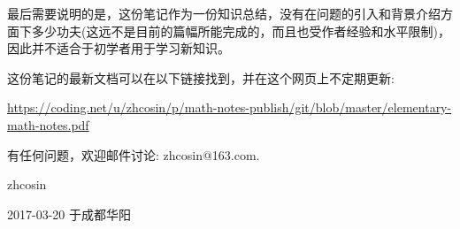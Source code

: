 最后需要说明的是，这份笔记作为一份知识总结，没有在问题的引入和背景介绍方面下多少功夫(这远不是目前的篇幅所能完成的，而且也受作者经验和水平限制)，因此并不适合于初学者用于学习新知识。

这份笔记的最新文档可以在以下链接找到，并在这个网页上不定期更新:

\hyperref[pdf-download-link]{https://coding.net/u/zhcosin/p/math-notes-publish/git/blob/master/elementary-math-notes.pdf}

有任何问题，欢迎邮件讨论: zhcosin@163.com.

\vspace{1.5cm}

\hfill zhcosin \hspace{5em}

\hfill 2017-03-20 于成都华阳 \hspace{1.5em}


